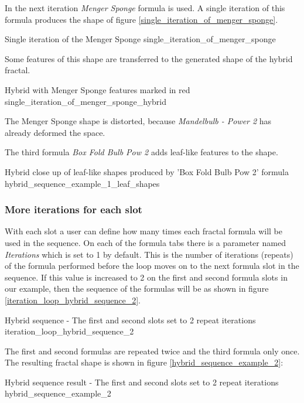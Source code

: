 In the next iteration \emph{Menger Sponge} formula is used. A single iteration
of this formula produces the shape of figure \ref{single_iteration_of_menger_sponge}.

{Single iteration of the Menger Sponge}
{single_iteration_of_menger_sponge}

Some features of this shape are transferred to the generated shape of the hybrid fractal.

{Hybrid with Menger Sponge features marked in red}
{single_iteration_of_menger_sponge_hybrid}

The Menger Sponge shape is distorted, because \emph{Mandelbulb - Power 2} has
already deformed the space.

The third formula \emph{Box Fold Bulb Pow 2} adds leaf-like features to the shape.

{Hybrid close up of leaf-like shapes produced by 'Box Fold Bulb Pow 2' formula}
{hybrid_sequence_example_1_leaf_shapes}

\subsubsection{More iterations for each slot}

With each slot a user can define how many times each fractal formula will be used in the sequence.
On each of the formula tabs there is a parameter named \emph{Iterations} which is set to 1 by default.
This is the number of iterations (repeats) of the formula performed before the loop moves on to the next formula slot in the sequence.
If this value is increased to 2 on the first and second formula slots in our example,
then the sequence of the formulas will be as shown in figure \ref{iteration_loop_hybrid_sequence_2}. \label{two-iterations-per-slot}

{Hybrid sequence - The first and second slots set to 2 repeat iterations}
{iteration_loop_hybrid_sequence_2}

The first and second formulas are repeated twice and the third formula only once.
The resulting fractal shape is shown in figure \ref{hybrid_sequence_example_2}:

{Hybrid sequence result - The first and second slots set to 2 repeat iterations}
{hybrid_sequence_example_2}


